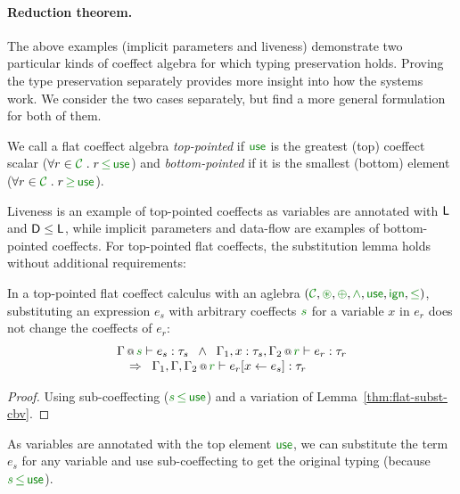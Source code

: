 \paragraph{Reduction theorem.}
The above examples (implicit parameters and liveness) demonstrate two particular kinds of coeffect 
algebra for which typing preservation holds. Proving the type preservation separately provides 
more insight into how the systems work. We consider the two cases separately, but find a more general
formulation for both of them.

\begin{definition}
We call a flat coeffect algebra \emph{top-pointed} if $\cunit$ is the greatest (top) coeffect scalar
($\forall r \in \C \;.\; r \,\cleq\, \cunit $) and \emph{bottom-pointed} if it is the smallest (bottom) 
element ($\forall r \in \C \;.\; r \,\cgeq\, \cunit $).
\end{definition}

\noindent
Liveness is an example of top-pointed coeffects as variables are annotated with 
$\textnormal{\sffamily L}$ and $\textnormal{\sffamily D} \leq \textnormal{\sffamily L}$, while implicit parameters and data-flow are examples
of bottom-pointed coeffects. For top-pointed flat coeffects, the substitution lemma holds without 
additional requirements:

\begin{lemma}
\label{thm:cbn-substitution-top}
In a top-pointed flat coeffect calculus with an aglebra $(\C, \cseq, \cpar, \czip, \cunit, \czero, \cleq)$,
substituting an expression $e_s$ with arbitrary coeffects $\cclrd{s}$ for a variable $x$ in $e_r$ does
not change the coeffects of $e_r$:
%
\begin{equation*}
\begin{array}{l}
 \coctx{\Gamma}{\cclrd{s}} \vdash e_s : \tau_s \;\; \wedge \;\; 
   \coctx{\Gamma_1,  x : \tau_s, \Gamma_2}{ \cclrd{r}  } \vdash e_r : \tau_r\\
 \quad \Rightarrow \;\; \coctx{\Gamma_1,\Gamma,\Gamma_2}{ \cclrd{r} } \vdash \subst{e_r}{x}{e_s} : \tau_r
\end{array}
\end{equation*}
\end{lemma}

\begin{proof}
Using sub-coeffecting ($\cclrd{s} \,\cleq\, \cunit$) and a variation of Lemma~\ref{thm:flat-subst-cbv}.
\end{proof}
%
\noindent
As variables are annotated with the top element $\cunit$, we can substitute the term $e_s$ 
for any variable and use sub-coeffecting to get the original typing (because
$\cclrd{s} \,\cleq\, \cunit$). 


